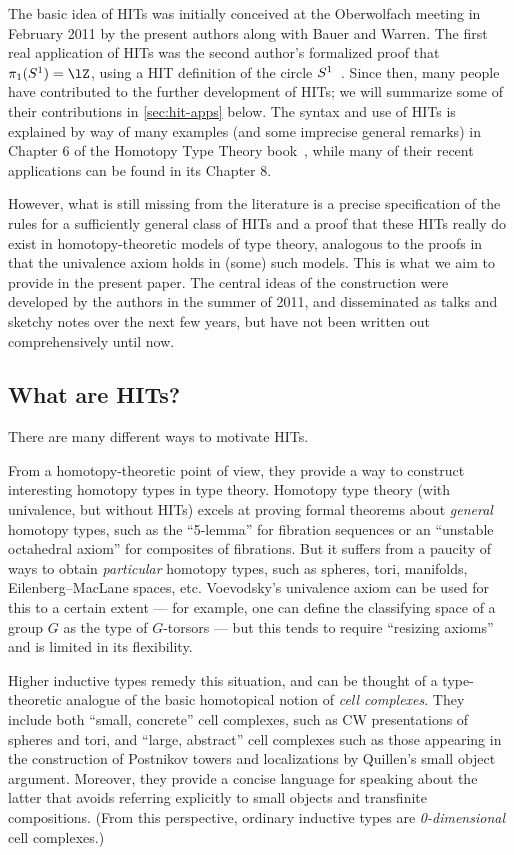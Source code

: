 \documentclass{amsart}
\begin{document}
The basic idea of HITs was initially conceived at the Oberwolfach meeting in February 2011 by the present authors along with Bauer and Warren.
The first real application of HITs was the second author's formalized proof that $\pi_1(\circtype)=\lZ$, using a HIT definition of the circle $S^1$~\cite{ls:pi1s1}.
Since then, many people have contributed to the further development of HITs; we will summarize some of their contributions in \cref{sec:hit-apps} below.
The syntax and use of HITs is explained by way of many examples (and some imprecise general remarks) in Chapter 6 of the Homotopy Type Theory book~\cite{hottbook}, while many of their recent applications can be found in its Chapter 8.

However, what is still missing from the literature is a precise specification of the rules for a sufficiently general class of HITs and a proof that these HITs really do exist in homotopy-theoretic models of type theory, analogous to the proofs in~\cite{klv:ssetmodel,shulman:invdia,shulman:elreedy} that the univalence axiom holds in (some) such models.
This is what we aim to provide in the present paper.
The central ideas of the construction were developed by the authors in the summer of 2011, and disseminated as talks and sketchy notes over the next few years, but have not been written out comprehensively until now.


\subsection{What are HITs?}
\label{sec:what-are-hits}

There are many different ways to motivate HITs.

From a homotopy-theoretic point of view, they provide a way to construct interesting homotopy types in type theory.
Homotopy type theory (with univalence, but without HITs) excels at proving formal theorems about \emph{general} homotopy types, such as the ``5-lemma'' for fibration sequences or an ``unstable octahedral axiom'' for composites of fibrations.
But it suffers from a paucity of ways to obtain \emph{particular} homotopy types, such as spheres, tori, manifolds, Eilenberg--MacLane spaces, etc.
Voevodsky's univalence axiom can be used for this to a certain extent --- for example, one can define the classifying space of a group $G$ as the type of $G$-torsors --- but this tends to require ``resizing axioms'' and is limited in its flexibility.

Higher inductive types remedy this situation, and can be thought of a type-theoretic analogue of the basic homotopical notion of \emph{cell complexes}.
They include both ``small, concrete'' cell complexes, such as CW presentations of spheres and tori, and ``large, abstract'' cell complexes such as those appearing in the construction of Postnikov towers and localizations by Quillen's small object argument.
Moreover, they provide a concise language for speaking about the latter that avoids referring explicitly to small objects and transfinite compositions.
(From this perspective, ordinary inductive types are \emph{0-dimensional} cell complexes.)
\end{document}
